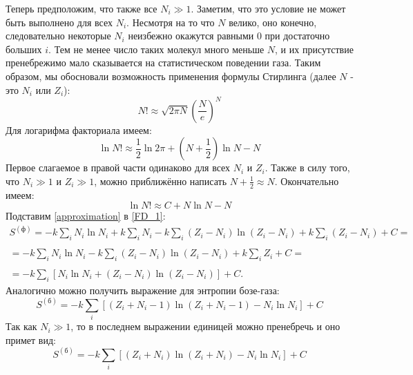 \documentclass[A4]{article}
\begin{document}
    Теперь предположим, что также все $N_i \gg 1$. Заметим, что это условие не может быть выполнено
    для всех $N_i$. Несмотря на то что $N$ велико, оно конечно, следовательно некоторые $N_i$
    неизбежно окажутся равными 0 при достаточно больших $i$. Тем не менее число таких молекул
    много меньше $N$, и их присутствие пренебрежимо мало сказывается на статистическом поведении
    газа. Таким образом, мы обосновали возможность применения формулы Стирлинга (далее $N$ - это
    $N_i$ или $Z_i$):
    \begin{equation*}
        N! \approx \sqrt{2\pi N}\left(\frac{N}{e}\right)^N
    \end{equation*}
    Для логарифма факториала имеем:
    \begin{equation*}
        \ln{N!} \approx \frac{1}{2}\ln{2\pi} + \left(N + \frac{1}{2}\right)\ln{N} - N
    \end{equation*}
    Первое слагаемое в правой части одинаково для всех $N_i$ и $Z_i$. Также в силу того, что
    $N_i \gg 1$ и $Z_i \gg 1$, можно приближённо написать $N + \frac{1}{2} \approx N$. Окончательно
    имеем:
    \begin{equation}\label{approximation}
        \ln{N!} \approx C + N\ln{N} - N
    \end{equation}
    Подставим \eqref{approximation} в \eqref{FD_1}:
    \begin{equation}\label{FD_2}
    \begin{split}
        S^{(\text{ф})} = -k\sum\limits_{i}N_i\ln{N_i} + k\sum\limits_{i}N_i -
        k\sum\limits_{i}(Z_i - N_i)\ln{(Z_i - N_i)} + k\sum\limits_{i}(Z_i - N_i) + C = \\\\
        = -k\sum\limits_{i}N_i\ln{N_i} - k\sum\limits_{i}(Z_i - N_i)\ln{(Z_i - N_i)} +
        k\sum\limits_{i}Z_i + C = \\\\ = -k\sum\limits_{i}[N_i\ln{N_i} + (Z_i - N_i)\ln{(Z_i - N_i)}] + C.
    \end{split}
    \end{equation}
    Аналогично можно получить выражение для энтропии бозе-газа:
    \begin{equation*}
        S^{(\text{б})} = -k\sum\limits_{i}[(Z_i + N_i - 1)\ln{(Z_i + N_i - 1)} - N_i\ln{N_i}] + C
    \end{equation*}
    Так как $N_i \gg 1$, то в последнем выражении единицей можно пренебречь и оно примет вид:
    \begin{equation}\label{BE}
        S^{(\text{б})} = -k\sum\limits_{i}[(Z_i + N_i)\ln{(Z_i + N_i)} - N_i\ln{N_i}] + C
    \end{equation}
\end{document}
